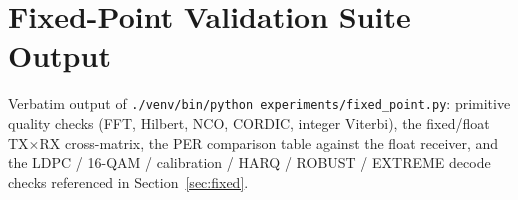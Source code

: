 \section{Fixed-Point Validation Suite Output}
\label{app:fixed}

Verbatim output of
\texttt{./venv/bin/python experiments/fixed\_point.py}: primitive
quality checks (FFT, Hilbert, NCO, CORDIC, integer Viterbi), the
fixed/float TX$\times$RX cross-matrix, the PER comparison table
against the float receiver, and the LDPC / 16-QAM / calibration /
HARQ / ROBUST / EXTREME decode checks referenced in
Section~\ref{sec:fixed}.


